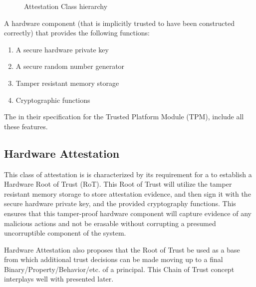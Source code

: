 \documentclass[acmsmall]{acmart}
\theoremstyle{definition}
\newcommand{\defn}[2]{
  \begin{flushleft}
  \begin{definition}[\textbf{#1}]\label{defn:#1}
    #2
  \end{definition}
  \end{flushleft}
}
\begin{document}
\begin{figure}[ht]
  \label{fig:Attestation-Classes}
  \caption{Attestation Class hierarchy}
\end{figure}

\defn{Trusted Hardware Component}{
  A hardware component (that is implicitly trusted to have been constructed correctly) that provides the following functions:
  \begin{enumerate}
    \item A secure hardware private key
    \item A secure random number generator
    \item Tamper resistant memory storage
    \item Cryptographic functions
  \end{enumerate}
}
The \citet{Trusted-Computing-Group:07:TCG-TPM-Specifi} in their specification for the Trusted Platform Module (TPM), include all these features.

\subsection{Hardware Attestation}
This class of attestation is is characterized by its requirement for a 
to establish a Hardware Root of Trust (RoT). This Root of Trust will utilize the tamper resistant
memory storage to store attestation evidence, and then sign it with the secure hardware private key,
and the provided cryptography functions. This ensures that this tamper-proof
hardware component will capture evidence of any malicious actions and not be erasable without
corrupting a presumed uncorruptible component of the system.

Hardware Attestation also proposes that the Root of Trust be used as a base from
which additional trust decisions can be made moving up to a final Binary/Property/Behavior/etc.
of a principal. This Chain of Trust concept interplays well with  
presented later.
\end{document}
